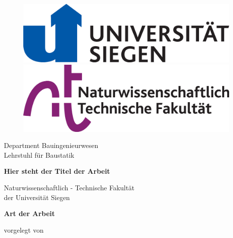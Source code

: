 %
\begin{titlepage}
%
\begin{figure}[t!]
    \centering
    \includegraphics[scale=.15]{img/Logos/uni-siegen_farbig_cmyk.eps}
    \hfill
    \includegraphics[scale=.15]{img/Logos/fak4_logo_cmyk.eps}
\end{figure}
%
\hspace*{10.5 cm}
\textsf{Department Bauingenieurwesen} \\
\hspace*{10.5 cm}
\textsf{Lehrstuhl für Baustatik}
%
\vspace{1cm}
%
\begin{center}
\LARGE{\sffamily\bfseries{%
Hier steht der Titel der Arbeit}}
\end{center}
%
\begin{center}
\large{Naturwissenschaftlich - Technische Fakultät \\
der Universität Siegen \\}
\end{center}
%
\vspace{0.05 cm}
%
\begin{center}
\textbf{\Large{Art der Arbeit}}
\end{center}
%
\vspace{0.05 cm}
%
%
\begin{center}
vorgelegt von
\end{center}
%
\begin{center}

\end{center}
\end{titlepage}
